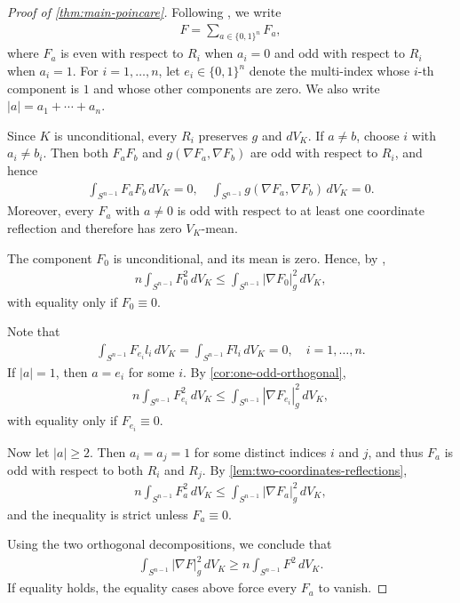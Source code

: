 \documentclass[12pt]{amsart}
\newcommand{\Sn}{S^{n-1}}
\newcommand{\abs}[1]{\left|#1\right|}
\newcommand{\eq}[1]{\begin{equation}\begin{alignedat}{2}#1\end{alignedat}\end{equation}}
\theoremstyle{plain}
\theoremstyle{definition}
\theoremstyle{remark}
\numberwithin{equation}{section}
\begin{document}
\begin{proof}[Proof of \autoref{thm:main-poincare}]
Following \cite[Proof of Thm. 8.7]{CKLR24}, we write
\eq{
F=\sum_{a\in\{0,1\}^n}F_a,
}
where $F_a$ is even with respect to $R_i$ when $a_i=0$ and odd with respect to $R_i$ when $a_i=1$. For $i=1,\ldots,n$, let $e_i\in\{0,1\}^n$ denote the multi-index whose $i$-th component is $1$ and whose other components are zero. We also write $\abs{a}=a_1+\cdots+a_n$.

Since $K$ is unconditional, every $R_i$ preserves $g$ and $dV_K$. If $a\ne b$, choose $i$ with $a_i\ne b_i$. Then both $F_aF_b$ and $g(\nabla F_a,\nabla F_b)$ are odd with respect to $R_i$, and hence
\eq{
\int_{\Sn}F_aF_b\,dV_K=0,
\quad
\int_{\Sn}g(\nabla F_a,\nabla F_b)\,dV_K=0.
}
Moreover, every $F_a$ with $a\ne 0$ is odd with respect to at least one coordinate reflection and therefore has zero $V_K$-mean.

The component $F_0$ is unconditional, and its mean is zero. Hence, by \cite[Thm. 8.12]{HI26},
\eq{
n\int_{\Sn}F_0^2\,dV_K
\le \int_{\Sn}\abs{\nabla F_0}_g^2\,dV_K,
}
with equality only if $F_0\equiv 0$.

Note that
\eq{
 \int_{\Sn}F_{e_i}l_i\,dV_K=\int_{\Sn}Fl_i\,dV_K=0,
 \quad i=1,\ldots,n.
}
If $\abs{a}=1$, then $a=e_i$ for some $i$. By
\autoref{cor:one-odd-orthogonal},
\eq{
 n\int_{\Sn}F_{e_i}^2\,dV_K
 \leq\int_{\Sn}|\nabla F_{e_i}|_g^2\,dV_K,
}
with equality only if $F_{e_i}\equiv 0$.


Now let $\abs{a}\geq2$. Then $a_i=a_j=1$ for some distinct indices $i$ and $j$, and thus $F_a$ is odd with respect to both $R_i$ and $R_j$. By \autoref{lem:two-coordinates-reflections},
\eq{
n\int_{\Sn}F_a^2\,dV_K \le
\int_{\Sn}\abs{\nabla F_a}_g^2\,dV_K,
}
and the inequality is strict unless $F_a\equiv 0$.

Using the two orthogonal decompositions, we conclude that
\eq{
\int_{\Sn}\abs{\nabla F}_g^2\,dV_K\geq n\int_{\Sn}F^2\,dV_K.
}
If equality holds, the equality cases above force every $F_a$ to vanish.
\end{proof}
\end{document}
